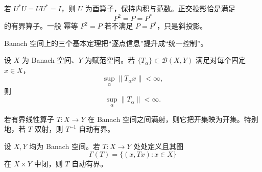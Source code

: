 \begin{definition}[酉算子与正交投影]
若 $U^*U=UU^*=I$，则 $U$ 为酉算子，保持内积与范数。正交投影恰是满足
\[
P^2=P=P^*
\]
的有界算子。一般 幂等 $P^2=P$ 若不满足 $P=P^*$，只是斜投影。
\end{definition}

Banach 空间上的三个基本定理把“逐点信息”提升成“统一控制”。

\begin{theorem}[一致有界原理]
设 $X$ 为 Banach 空间、$Y$ 为赋范空间。若 $\{T_\alpha\}\subset\mathcal B(X,Y)$ 满足对每个固定 $x\in X$，
\[
\sup_\alpha\|T_\alpha x\|<\infty,
\]
则
\[
{\sup_\alpha\|T_\alpha\|<\infty}.
\]
\end{theorem}

\begin{theorem}[开映射定理]
若有界线性算子 $T:X\to Y$ 在 Banach 空间之间满射，则它把开集映为开集。特别地，若 $T$ 双射，则 $T^{-1}$ 自动有界。
\end{theorem}

\begin{theorem}[闭图定理]
设 $X,Y$ 均为 Banach 空间。若 $T:X\to Y$ 处处定义且其图
\[
\Gamma(T)=\{(x,Tx):x\in X\}
\]
在 $X\times Y$ 中闭，则 $T$ 自动有界。
\end{theorem}

